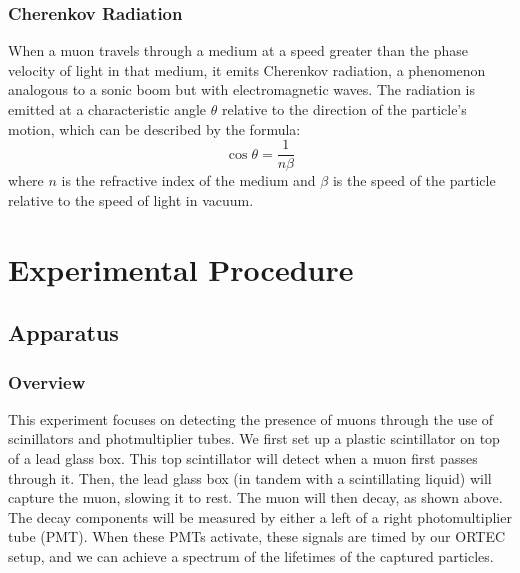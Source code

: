 \documentclass[10pt,letterpaper,onecolumn]{article}
\begin{document}
\subsubsection{Cherenkov Radiation}

When a muon travels through a medium at a speed greater than the phase velocity of light in that medium, it emits Cherenkov radiation, a phenomenon analogous to a sonic boom but with electromagnetic waves. The radiation is emitted at a characteristic angle $\theta$ relative to the direction of the particle's motion, which can be described by the formula:
\[
\cos\theta = \frac{1}{n\beta}
\]
where $n$ is the refractive index of the medium and $\beta$ is the speed of the particle relative to the speed of light in vacuum. 
\cite{Jackson1999Electrodynamics}

\section{Experimental Procedure}
\subsection{Apparatus}
\subsubsection{Overview}
This experiment focuses on detecting the presence of muons through the use of scinillators and photmultiplier tubes. We first set up a plastic scintillator on top of a lead glass box. This top scintillator will detect when a muon first passes through it. Then, the lead glass box (in tandem with a scintillating liquid) will capture the muon, slowing it to rest. The muon will then decay, as shown above. The decay components will be measured by either a left of a right photomultiplier tube (PMT). When these PMTs activate, these signals are timed by our ORTEC setup, and we can achieve a spectrum of the lifetimes of the captured particles. 
\end{document}
